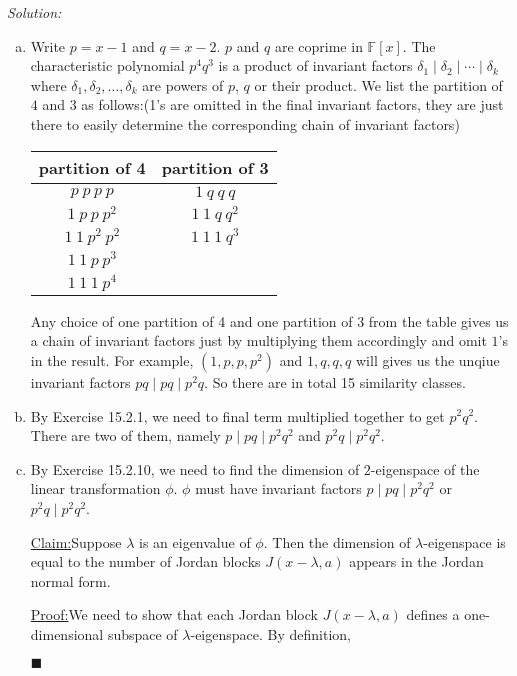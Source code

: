 \documentclass[a4paper, 12pt]{article}
\newenvironment{solution}
    {\textit{Solution:}}
    {}
\newenvironment{claim}[1]{\par\noindent\underline{Claim:}\space#1}{}
\newenvironment{claimproof}[1]{\par\noindent\underline{Proof:}\space#1}{\hfill $\blacksquare$}
\begin{document}
\begin{solution}
\begin{enumerate}[(a)]
\item Write \(p=x-1\) and \(q=x-2\). \(p\) and \(q\) are coprime in \(\mathbb{F}[x]\). The characteristic polynomial \(p^4q^3\) is a product of invariant factors \(\delta_1\mid \delta_2\mid \cdots\mid \delta_k\) where 
\(\delta_1,\delta_2,\ldots,\delta_k\) are powers of \(p\), \(q\) or their product. We list the partition of \(4\) and \(3\) as follows:(1's are omitted in the final invariant factors, they are just there to easily determine the corresponding chain of invariant factors)
\begin{center}
\begin{tabular}{||c|c||}
	\hline
	partition of 4 & partition of 3 \\ [0.5ex] 
	\hline\hline
	$p\ p\ p\ p$ & $1\ q\ q\ q$\\ 
	\hline 
	$1\ p\ p\ p^2$ & $1\ 1\ q\ q^2$\\ 
	\hline 
	$1\  1\  p^2\ p^2$ & $1\ 1\ 1\ q^3$\\ 
	\hline 
	$1\ 1\ p\ p^3$ & \\ 
	\hline 
	$1\ 1\ 1\ p^4$ & \\ [1ex]
	\hline 
\end{tabular}
\end{center}
Any choice of one partition of 4 and one partition of 3 from the table gives us a chain of invariant factors just by multiplying them accordingly and omit \(1\)'s in the result. For example, 
\((1,p,p,p^2)\) and \(1,q,q,q\) will gives us the unqiue invariant factors \(pq\mid pq\mid p^2q\). So there are in total 15 similarity classes. 
\item By Exercise 15.2.1, we need to final term multiplied together to get \(p^2q^2\). There are two of them, namely \(p\mid pq\mid p^2q^2\) and \(p^2q\mid p^2q^2\).
\item By Exercise 15.2.10, we need to find the dimension of \(2\)-eigenspace of the linear transformation \(\phi\). \(\phi\) must have invariant factors \(p\mid pq\mid p^2q^2\) or \(p^2q\mid p^2q^2\). 
\begin{claim}
Suppose \(\lambda\) is an eigenvalue of \(\phi\). Then the dimension of \(\lambda\)-eigenspace is equal to the number of Jordan blocks \(J(x-\lambda,a)\) appears in the Jordan normal form. 
\end{claim}
\begin{claimproof}
We need to show that each Jordan block \(J(x-\lambda,a)\) defines a one-dimensional subspace of \(\lambda\)-eigenspace. By definition, 

\end{claimproof}
\end{enumerate}
\end{solution}
\end{document}

